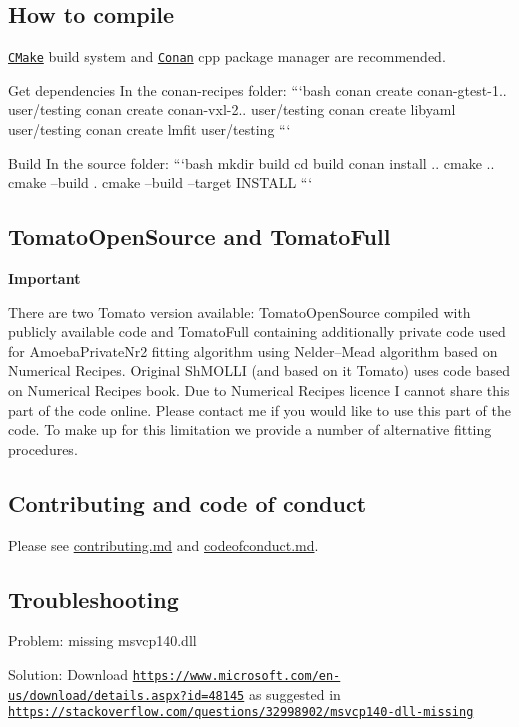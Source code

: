 \subsection*{How to compile}

\href{cmake.org}{\tt C\+Make} build system and \href{conan.io}{\tt Conan} cpp package manager are recommended.


\begin{DoxyEnumerate}
\item Get dependencies In the conan-\/recipes folder\+: ```bash conan create conan-\/gtest-\/1.. user/testing conan create conan-\/vxl-\/2.. user/testing conan create libyaml user/testing conan create lmfit user/testing ```
\item Build In the source folder\+: ```bash mkdir build cd build conan install .. cmake .. cmake --build . cmake --build --target I\+N\+S\+T\+A\+LL ```
\end{DoxyEnumerate}

\subsection*{Tomato\+Open\+Source and Tomato\+Full}

{\bfseries Important}

There are two {\ttfamily Tomato} version available\+: {\ttfamily Tomato\+Open\+Source} compiled with publicly available code and {\ttfamily Tomato\+Full} containing additionally private code used for {\ttfamily Amoeba\+Private\+Nr2} fitting algorithm using Nelder–\+Mead algorithm based on Numerical Recipes. Original Sh\+M\+O\+L\+LI (and based on it Tomato) uses code based on Numerical Recipes book. Due to Numerical Recipes licence I cannot share this part of the code online. Please contact me if you would like to use this part of the code. To make up for this limitation we provide a number of alternative fitting procedures.

\subsection*{Contributing and code of conduct}

Please see \hyperlink{md_contributing}{contributing.md} and \hyperlink{md_codeofconduct}{codeofconduct.md}.

\subsection*{Troubleshooting}


\begin{DoxyItemize}
\item Problem\+: missing msvcp140.\+dll
\item Solution\+: Download \href{https://www.microsoft.com/en-us/download/details.aspx?id=48145}{\tt https\+://www.\+microsoft.\+com/en-\/us/download/details.\+aspx?id=48145} as suggested in \href{https://stackoverflow.com/questions/32998902/msvcp140-dll-missing}{\tt https\+://stackoverflow.\+com/questions/32998902/msvcp140-\/dll-\/missing} 
\end{DoxyItemize}